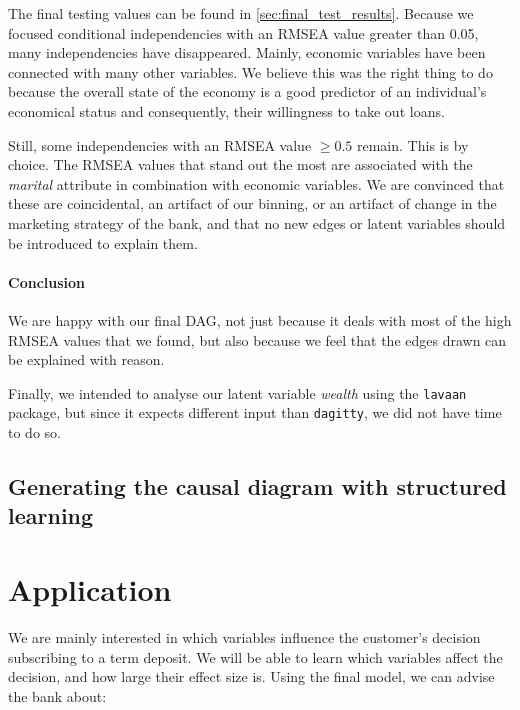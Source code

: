 \documentclass[11pt,]{article}
\let\oldparagraph\paragraph
\renewcommand{\paragraph}[1]{\oldparagraph{#1}\mbox{}}
\begin{document}
\begin{multicols}{2}
The final testing values can be found in
\autoref{sec:final_test_results}. Because we focused conditional
independencies with an RMSEA value greater than 0.05, many
independencies have disappeared. Mainly, economic variables have been
connected with many other variables. We believe this was the right thing
to do because the overall state of the economy is a good predictor of an
individual's economical status and consequently, their willingness to
take out loans.

Still, some independencies with an RMSEA value \(\ge 0.5\) remain. This
is by choice. The RMSEA values that stand out the most are associated
with the \textit{marital} attribute in combination with economic
variables. We are convinced that these are coincidental, an artifact of
our binning, or an artifact of change in the marketing strategy of the
bank, and that no new edges or latent variables should be introduced to
explain them.

\hypertarget{conclusion}{%
\paragraph{Conclusion}\label{conclusion}}

We are happy with our final DAG, not just because it deals with most of
the high RMSEA values that we found, but also because we feel that the
edges drawn can be explained with reason.

Finally, we intended to analyse our latent variable \textit{wealth}
using the \texttt{lavaan} package, but since it expects different input
than \texttt{dagitty}, we did not have time to do so.

\hypertarget{generating-the-causal-diagram-with-structured-learning}{%
\subsection{Generating the causal diagram with structured
learning}\label{generating-the-causal-diagram-with-structured-learning}}

\hypertarget{application}{%
\section{Application}\label{application}}

We are mainly interested in which variables influence the customer's
decision subscribing to a term deposit. We will be able to learn which
variables affect the decision, and how large their effect size is. Using
the final model, we can advise the bank about:


\end{multicols}
\end{document}
